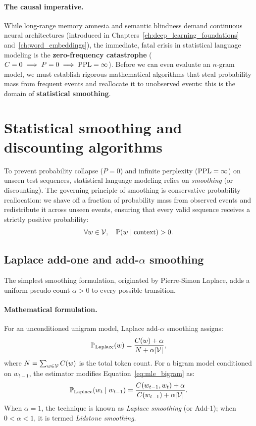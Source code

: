 \documentclass[../../main.tex]{subfiles}
\begin{document}
\paragraph{The causal imperative.}
While long-range memory amnesia and semantic blindness demand continuous neural architectures (introduced in Chapters~\ref{ch:deep_learning_foundations} and~\ref{ch:word_embeddings}), the immediate, fatal crisis in statistical language modeling is the \textbf{zero-frequency catastrophe} ($C=0 \implies P=0 \implies \mathrm{PPL}=\infty$). Before we can even evaluate an $n$-gram model, we must establish rigorous mathematical algorithms that steal probability mass from frequent events and reallocate it to unobserved events: this is the domain of \textbf{statistical smoothing}.


\clearpage
\section{Statistical smoothing and discounting algorithms}
\label{sec:smoothing}

To prevent probability collapse ($P=0$) and infinite perplexity ($\mathrm{PPL}=\infty$) on unseen test sequences, statistical language modeling relies on \emph{smoothing} (or discounting). The governing principle of smoothing is conservative probability reallocation: we shave off a fraction of probability mass from observed events and redistribute it across unseen events, ensuring that every valid sequence receives a strictly positive probability:
\[
\forall w \in \mathcal{V}, \quad \mathbb{P}(w \mid \text{context}) > 0.
\]

\subsection{Laplace add-one and add-\texorpdfstring{$\alpha$}{alpha} smoothing}
The simplest smoothing formulation, originated by Pierre-Simon Laplace, adds a uniform pseudo-count $\alpha > 0$ to every possible transition.

\paragraph{Mathematical formulation.}
For an unconditioned unigram model, Laplace add-$\alpha$ smoothing assigns:
\begin{equation}
\label{eq:laplace_unigram}
\mathbb{P}_{\text{Laplace}}(w) = \frac{C(w) + \alpha}{N + \alpha |\mathcal{V}|},
\end{equation}
where $N = \sum_{w \in \mathcal{V}} C(w)$ is the total token count. For a bigram model conditioned on $w_{t-1}$, the estimator modifies Equation~\eqref{eq:mle_bigram} as:
\begin{equation}
\label{eq:laplace_bigram}
\mathbb{P}_{\text{Laplace}}(w_t \mid w_{t-1}) = \frac{C(w_{t-1}, w_t) + \alpha}{C(w_{t-1}) + \alpha |\mathcal{V}|}.
\end{equation}
When $\alpha = 1$, the technique is known as \emph{Laplace smoothing} (or Add-1); when $0 < \alpha < 1$, it is termed \emph{Lidstone smoothing}.
\end{document}
